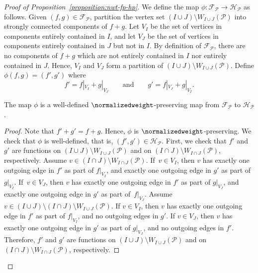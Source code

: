 \begin{proof}[Proof of Proposition~\ref{proposition:nwt-fp-hp}]
We define the map \(\phi \colon \mathcal{F}_{\mathcal{P}} \to \mathcal{H}_{\mathcal{P}}\) as follows.
Given \mbox{\((f, g) \in \mathcal{F}_{\mathcal{P}}\)},
partition the vertex set \((I \cup J) \setminus W_{I \cup J}(\mathcal{P})\) into strongly connected components of \(f+g\).
Let \(V_I\) be the set of vertices in components entirely contained in \(I\), and let \(V_J\) be the set of vertices in components entirely contained in \(J\) but not in \(I\).
By definition of \(\mathcal{F}_{\mathcal{P}}\), there are no components of \(f+g\) which are not entirely contained in \(I\) nor entirely contained in \(J\).
Hence, \(V_I\) and \(V_J\) form a partition of \((I \cup J) \setminus W_{I \cup J}(\mathcal{P})\).
Define \(\phi(f, g) = (f', g')\) where
\begin{equation*}
    f' = f|_{V_I} + g|_{V_J} \qquad \text{and} \qquad g' = f|_{V_J} + g|_{V_I}.
\end{equation*}

\begin{claim} \label{claim:phi-well-defined}
    The map \(\phi\) is a well-defined \(\normalizedweight\)-preserving map from \(\mathcal{F}_{\mathcal{P}}\) to \(\mathcal{H}_{\mathcal{P}}\).
\end{claim}

\begin{proof}
Note that \(f' + g' = f + g\).
Hence, \(\phi\) is \(\normalizedweight\)-preserving.
We check that \(\phi\) is well-defined, that is, \((f', g') \in \mathcal{H}_{\mathcal{P}}\).
First, we check that \(f'\) and \(g'\) are functions on \((I \cup J) \setminus W_{I \cup J}(\mathcal{P})\) and on \((I \cap J) \setminus W_{I \cap J}(\mathcal{P})\), respectively.
Assume \(v \in (I \cap J) \setminus W_{I \cap J}(\mathcal{P})\).
If~\(v \in V_I\), then \(v\) has exactly one outgoing edge in \(f'\) as part of \(f|_{V_I}\), 
and exactly one outgoing edge in \(g'\) as part of \(g|_{V_I}\).
If~\(v \in V_J\), then \(v\) has exactly one outgoing edge in \(f'\) as part of \(g|_{V_J}\),
and exactly one outgoing edge in \(g'\) as part of~\(f|_{V_J}\).
Assume \(v \in (I \cup J) \setminus (I \cap J) \setminus W_{I \cup J}(\mathcal{P})\).
If \(v \in V_I\), then \(v\) has exactly one outgoing edge in \(f'\) as part of \(f|_{V_I}\), and no outgoing edges in \(g'\).
If \(v \in V_J\), then \(v\) has exactly one outgoing edge in \(g'\) as part of \(g|_{V_J}\), and no outgoing edges in \(f'\).
Therefore, \(f'\) and \(g'\) are functions on \((I \cup J) \setminus W_{I \cup J}(\mathcal{P})\) and on \((I \cap J) \setminus W_{I \cap J}(\mathcal{P})\), respectively.


\end{proof}
\end{proof}
